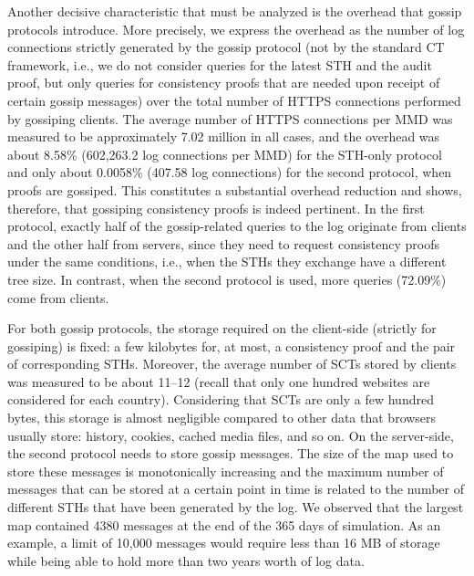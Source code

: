 Another decisive characteristic that must be analyzed is the overhead that
gossip protocols introduce.
More precisely, we express the overhead as the number of log connections
strictly generated by the gossip protocol (not by the standard CT framework, i.e., we do not
consider queries for the latest STH and the audit proof, but only queries for consistency
proofs that are needed upon receipt of certain gossip messages) over the total number of
HTTPS connections performed by gossiping clients.
The average number of HTTPS connections per MMD was measured to be approximately 7.02 million
in all cases, and the overhead was about 8.58\% (602,263.2 log connections per MMD)
for the STH-only protocol and only about 0.0058\% (407.58 log connections) for
the second protocol, when proofs are gossiped. This constitutes a substantial overhead  reduction and shows, therefore, that gossiping consistency proofs is indeed pertinent.
In the first protocol, exactly half of the gossip-related queries to the log originate
from clients and the other half from servers, since they need to request consistency proofs
under the same conditions, i.e., when the STHs they exchange have a different tree size.
In contrast, when the second protocol is used, more queries (72.09\%) come from clients.

For both gossip protocols, the storage required on the client-side (strictly for
gossiping) is fixed: a few kilobytes for, at most, a consistency proof and the pair of
corresponding STHs. Moreover, the average number of SCTs stored by clients was measured to be
about 11--12 (recall that only one hundred websites are considered for each country).
Considering that SCTs are only a few hundred bytes, this storage is almost negligible compared
to other data that browsers usually store: history, cookies, cached media files, and so on.
On the server-side, the second protocol needs to store gossip messages. The size of the map used
to store these messages is monotonically increasing and the maximum number of messages that
can be stored at a certain point in time is related to the number of different STHs that have
been generated by the log. We observed that the largest map contained 4380 messages at the end
of the 365 days of simulation. As an example, a limit of 10,000 messages would require less than
16 MB of storage while being able to hold more than two years worth of log data.

